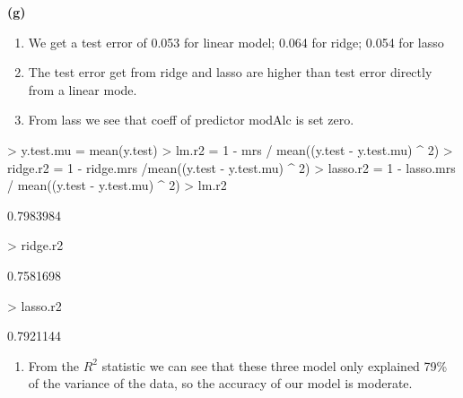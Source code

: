 \documentclass[a4paper]{article}
\renewcommand{\part}[1] {\vspace{.10in} {\bf (#1)}}
\begin{document}
\part{g}
{\color{red}
\begin{enumerate}
\item We get a test error of 0.053 for linear model; 0.064 for ridge; 0.054 for lasso
\item The test error get from ridge and lasso are higher than test error directly from a linear mode.
\item From lass we see that coeff of predictor modAlc is set zero.
\end{enumerate}
}

\begin{Schunk}
\begin{Sinput}
> y.test.mu = mean(y.test)
> lm.r2 = 1 - mrs / mean((y.test - y.test.mu) ^ 2)
> ridge.r2 = 1 - ridge.mrs /mean((y.test - y.test.mu) ^ 2)
> lasso.r2 = 1 - lasso.mrs / mean((y.test - y.test.mu) ^ 2)
> lm.r2
\end{Sinput}
\begin{Soutput}
[1] 0.7983984
\end{Soutput}
\begin{Sinput}
> ridge.r2
\end{Sinput}
\begin{Soutput}
[1] 0.7581698
\end{Soutput}
\begin{Sinput}
> lasso.r2
\end{Sinput}
\begin{Soutput}
[1] 0.7921144
\end{Soutput}
\end{Schunk}
{\color{red}
\begin{enumerate}
\item From the $R^2$ statistic we can see that these three model only explained 79\% of the variance of the data, so the accuracy of our model is moderate.
\end{enumerate}
}
\end{document}
